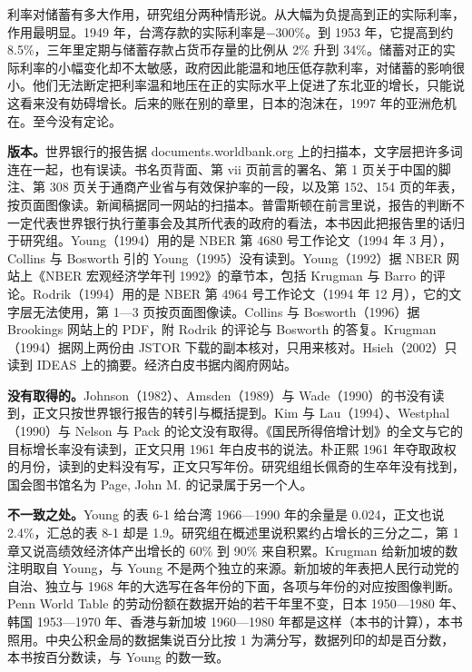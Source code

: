 利率对储蓄有多大作用，研究组分两种情形说。从大幅为负提高到正的实际利率，作用最明显\cite{worldbank1993}。1949 年，台湾存款的实际利率是$-300\%$\cite{worldbank1993}。到 1953 年，它提高到约 8.5\%，三年里定期与储蓄存款占货币存量的比例从 2\% 升到 34\%\cite{worldbank1993}。储蓄对正的实际利率的小幅变化却不太敏感，政府因此能温和地压低存款利率，对储蓄的影响很小\cite{worldbank1993}。他们无法断定把利率温和地压在正的实际水平上促进了东北亚的增长，只能说这看来没有妨碍增长\cite{worldbank1993}。后来的账在别的章里，日本的泡沫在，1997 年的亚洲危机在。至今没有定论。

\begin{deeper}[史料说明]
\textbf{版本。}世界银行的报告据 documents.worldbank.org 上的扫描本，文字层把许多词连在一起，也有误读。书名页背面、第 vii 页前言的署名、第 1 页关于中国的脚注、第 308 页关于通商产业省与有效保护率的一段，以及第 152、154 页的年表，按页面图像读。新闻稿据同一网站的扫描本。普雷斯顿在前言里说，报告的判断不一定代表世界银行执行董事会及其所代表的政府的看法\cite{worldbank1993}，本书因此把报告里的话归于研究组。Young（1994）用的是 NBER 第 4680 号工作论文（1994 年 3 月），Collins 与 Bosworth 引的 Young（1995）没有读到。Young（1992）据 NBER 网站上《NBER 宏观经济学年刊 1992》的章节本，包括 Krugman 与 Barro 的评论。Rodrik（1994）用的是 NBER 第 4964 号工作论文（1994 年 12 月），它的文字层无法使用，第 1—3 页按页面图像读。Collins 与 Bosworth（1996）据 Brookings 网站上的 PDF，附 Rodrik 的评论与 Bosworth 的答复。Krugman（1994）据网上两份由 JSTOR 下载的副本核对，只用来核对。Hsieh（2002）只读到 IDEAS 上的摘要。经济白皮书据内阁府网站。

\textbf{没有取得的。}Johnson（1982）、Amsden（1989）与 Wade（1990）的书没有读到，正文只按世界银行报告的转引与概括提到。Kim 与 Lau（1994）、Westphal（1990）与 Nelson 与 Pack 的论文没有取得。《国民所得倍增计划》的全文与它的目标增长率没有读到，正文只用 1961 年白皮书的说法。朴正熙 1961 年夺取政权的月份，读到的史料没有写，正文只写年份。研究组组长佩奇的生卒年没有找到，国会图书馆名为 Page, John M. 的记录属于另一个人。

\textbf{不一致之处。}Young 的表 6-1 给台湾 1966—1990 年的余量是 0.024，正文也说 2.4\%，汇总的表 8-1 却是 1.9。研究组在概述里说积累约占增长的三分之二，第 1 章又说高绩效经济体产出增长的 60\% 到 90\% 来自积累\cite{worldbank1993}。Krugman 给新加坡的数注明取自 Young，与 Young 不是两个独立的来源。新加坡的年表把人民行动党的自治、独立与 1968 年的大选写在各年份的下面，各项与年份的对应按图像判断。Penn World Table 的劳动份额在数据开始的若干年里不变，日本 1950—1980 年、韩国 1953—1970 年、香港与新加坡 1960—1980 年都是这样（本书的计算），本书照用。中央公积金局的数据集说百分比按 1 为满分写，数据列印的却是百分数，本书按百分数读，与 Young 的数一致。


\end{deeper}
